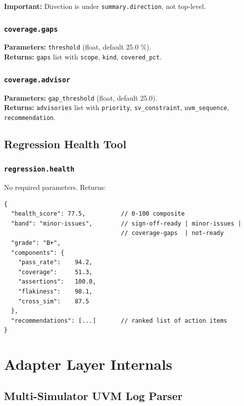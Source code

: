 \documentclass[11pt,a4paper]{article}
\begin{document}
\textbf{Important:} Direction is under \texttt{summary.direction}, not top-level.

\subsubsection{\texttt{coverage.gaps}}
\textbf{Parameters:} \texttt{threshold} (float, default 25.0 \%).\\
\textbf{Returns:} \texttt{gaps} list with \texttt{scope}, \texttt{kind}, \texttt{covered\_pct}.

\subsubsection{\texttt{coverage.advisor}}
\textbf{Parameters:} \texttt{gap\_threshold} (float, default 25.0).\\
\textbf{Returns:} \texttt{advisories} list with \texttt{priority}, \texttt{sv\_constraint},
\texttt{uvm\_sequence}, \texttt{recommendation}.

\subsection{Regression Health Tool}

\subsubsection{\texttt{regression.health}}
No required parameters. Returns:
\begin{lstlisting}[style=yaml]
{
  "health_score": 77.5,          // 0-100 composite
  "band": "minor-issues",        // sign-off-ready | minor-issues |
                                 // coverage-gaps  | not-ready
  "grade": "B+",
  "components": {
    "pass_rate":    94.2,
    "coverage":     51.3,
    "assertions":   100.0,
    "flakiness":    98.1,
    "cross_sim":    87.5
  },
  "recommendations": [...]       // ranked list of action items
}
\end{lstlisting}

\section{Adapter Layer Internals}

\subsection{Multi-Simulator UVM Log Parser}
\end{document}
